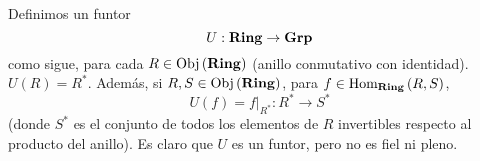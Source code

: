 \documentclass[12pt]{report}
\theoremstyle{largebreak}
\newcommand{\Obj}[1]{\ensuremath{\textup{Obj}\left(#1\right)}}
\newcommand{\Hom}[3]{\ensuremath{\textup{Hom}_{#1}\left(#2,#3\right)}}
\newcommand{\Cat}[1]{\ensuremath{\textup{\textbf{#1}}}}
\begin{document}
    \begin{exa}
        Definimos un funtor
        \begin{equation*}
            U:\Cat{Ring}\rightarrow\Cat{Grp}
        \end{equation*}
        como sigue, para cada $R\in\Obj{\Cat{Ring}}$ (anillo conmutativo con identidad). $U(R)=R^*$. Además, si $R,S\in\Obj{\Cat{Ring}}$, para $f\in\Hom{\Cat{Ring}}{R}{S}$,
        \begin{equation*}
            U(f)=f\big|_{ R^*}:R^*\rightarrow S^*
        \end{equation*}
        (donde $S^*$ es el conjunto de todos los elementos de $R$ invertibles respecto al producto del anillo). Es claro que $U$ es un funtor, pero no es fiel ni pleno.
    \end{exa}
\end{document}
